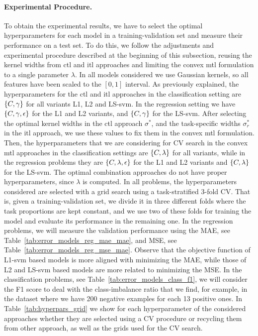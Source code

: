 \paragraph*{Experimental Procedure.}
To obtain the experimental results, we have to select the optimal hyperparameters for each model in a training-validation set and measure their performance on a test set. To do this, we follow the adjustments and experimental procedure described at the beginning of this subsection, reusing the kernel widths from \acrshort{ctl} and \acrshort{itl} approaches and limiting the convex \acrshort{mtl} formulation to a single parameter $\lambda$.
%
In all models considered we use Gaussian kernels, so all features have been scaled to the $[0, 1]$ interval.
As previously explained, the hyperparameters for the \acrshort{ctl} and \acrshort{itl} approaches in the classification setting are $\left\{C, \gamma\right\}$ for all variants L1, L2 and LS-\acrshort{svm}.
In the regression setting we have $\left\{C, \gamma, \epsilon\right\}$ for the L1 and L2 variants, and $\left\{C, \gamma\right\}$ for the LS-\acrshort{svm}.
%
After selecting the optimal kernel widths in the \acrshort{ctl} approach $\sigma^*$, and the task-specific widths $\sigma_r^*$ in the \acrshort{itl} approach, we use these values to fix them in the convex \acrshort{mtl} formulation.
Then, the hyperparameters that we are considering for CV search in the convex \acrshort{mtl} approaches in the classification settings are $\left\{C, \lambda\right\}$ for all variants, while in the regression problems they are $\left\{C, \lambda, \epsilon\right\}$ for the L1 and L2 variants and $\left\{C, \lambda\right\}$ for the LS-\acrshort{svm}.
%
The optimal combination approaches do not have proper hyperparameters, since $\lambda$ is computed.
%
In all problems, the hyperparameters considered are selected with a grid search using a task-stratified $3$-fold CV. That is, given a training-validation set, we divide it in three different folds where the task proportions are kept constant, and we use two of these folds for training the model and evaluate its performance in the remaining one.
%
In the regression problems, we will measure the validation performance using the MAE, see Table~\ref{tab:error_models_reg_mae_mae}, and MSE, see Table~\ref{tab:error_models_reg_mse_mae}.  Observe that the objective function of L1-\acrshort{svm} based models is more aligned with minimizing the MAE, while those of L2 and LS-\acrshort{svm} based models are more related to minimizing the MSE.
In the classification problems, see Table~\ref{tab:error_models_class_f1}, we will consider the F1 score to deal with the class-imbalance ratio that we find, for example, in the  dataset where we have 200 negative examples for each 13 positive ones.
%
In Table~\ref{tab:hyperpars_grid} we show for each hyperparameter of the considered approaches whether they are selected using a CV procedure or recycling them from other approach, as well as the grids used for the CV search.

